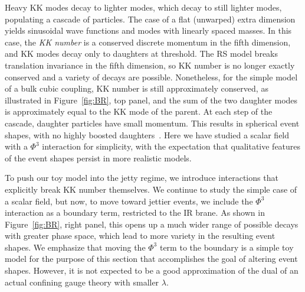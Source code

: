 Heavy KK modes decay to lighter modes, which decay to still lighter modes, populating a cascade of particles. The case of a flat (unwarped) extra dimension yields sinusoidal wave functions and modes with linearly spaced masses. In this case, the \emph{KK number} is a conserved discrete momentum in the fifth dimension, and KK modes decay only to daughters at threshold. The RS model breaks translation invariance in the fifth dimension, so KK number is no longer exactly conserved and a variety of decays are possible. Nonetheless, for the simple model of a bulk cubic coupling, KK number is still approximately conserved, as illustrated in Figure~\ref{fig:BR}, top panel, and the sum of the two daughter modes is approximately equal to the KK mode of the parent. At each step of the cascade, daughter particles have small momentum. This results in spherical event shapes, with no highly boosted daughters~\cite{Csaki:2008dt}. Here we have studied a scalar field with a $\Phi^3$ interaction for simplicity, with the expectation that qualitative features of the event shapes persist in more realistic models.

To push our toy model into the jetty regime, we introduce interactions that explicitly break KK number themselves. We continue to study the simple case of a scalar field, but now, to move toward jettier events, we include the $\Phi^3$ interaction as a boundary term, restricted to the IR brane. As shown in Figure~\ref{fig:BR}, right panel, this opens up a much wider range of possible decays with greater phase space, which lead to more variety in the resulting event shapes. We emphasize that moving the $\Phi^3$ term to the boundary is a simple toy model for the purpose of this section that accomplishes the goal of altering event shapes. However, it is not expected to be a good approximation of the dual of an actual confining gauge theory with smaller $\lambda$.

